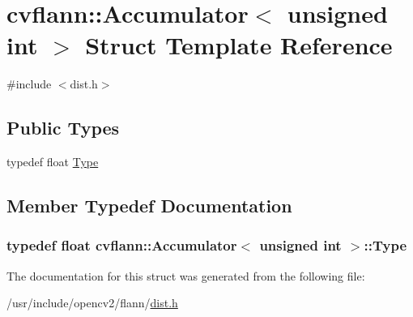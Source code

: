 \hypertarget{structcvflann_1_1Accumulator_3_01unsigned_01int_01_4}{\section{cvflann\-:\-:Accumulator$<$ unsigned int $>$ Struct Template Reference}
\label{structcvflann_1_1Accumulator_3_01unsigned_01int_01_4}
}


{\ttfamily \#include $<$dist.\-h$>$}

\subsection*{Public Types}
\begin{DoxyCompactItemize}
\item 
typedef float \hyperlink{structcvflann_1_1Accumulator_3_01unsigned_01int_01_4_af2df00a95ec76717aa12116277c1557b}{Type}
\end{DoxyCompactItemize}


\subsection{Member Typedef Documentation}
\hypertarget{structcvflann_1_1Accumulator_3_01unsigned_01int_01_4_af2df00a95ec76717aa12116277c1557b}{
\subsubsection[{Type}]{\setlength{\rightskip}{0pt plus 5cm}typedef float {\bf cvflann\-::\-Accumulator}$<$ unsigned int $>$\-::{\bf Type}}}\label{structcvflann_1_1Accumulator_3_01unsigned_01int_01_4_af2df00a95ec76717aa12116277c1557b}


The documentation for this struct was generated from the following file\-:\begin{DoxyCompactItemize}
\item 
/usr/include/opencv2/flann/\hyperlink{dist_8h}{dist.\-h}\end{DoxyCompactItemize}
